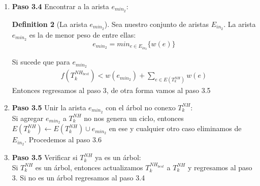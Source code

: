 \documentclass[letter,10pt]{article}
\theoremstyle{definition}
\newtheorem{definition}{Definition}[section]
\begin{document}
\begin{enumerate}{}
\begin{enumerate}
        Eliminamos $v_{in}$ de $T^{NH}_{k+1}$ de forma que obtenemos un bosque $(S_1,\dots,S_r)$. Aunque obtenemos un bosque, vamos a tomar este bosque como nuesto candidato al árbol $T^{NH}_k$ para el cual nos preocuparemos por construir en lo que resta del paso 3, si es que merece la pena.
        Procedemos ahora a encontrar el conjunto de aristas $E_{in_2}$:

        \begin{definition}[Las aristas $E_{in_2}$] Sea el bosque $(S_1, \dots , S_r)$ obtenido de $T^{NH}_{k+1}$ al eliminar $v_{in}$. Definimos a $E_{in_2}$ como:

        \[ E_{in_2} = \{(v_i,v_j) | v_i \in S_k, v_j\in S_l, k\neq l\}\]
        
        \end{definition}
        Pasamos al paso 3.4
        \item[] \textbf{Paso 3.4} Encontrar a la arista $e_{min_2}$:\\
        \begin{definition}[La arista $e_{min_2}$] Sea nuestro conjunto de aristas $E_{in_2}$. La arista $e_{min_2}$ es la de menor peso de entre ellas:
            \[e_{min_2} =  min_{e\in E_{in_2}} \{w(e)\}\]
        
        \end{definition}
        Si sucede que para $e_{min_2}$
        \begin{align}
            f(T^{NH_{best}}_k) < w(e_{min_2})+\sum_{e\in E(T^{NH}_{k} )}w(e)
        \end{align}
        Entonces regresamos al paso 3, de otra forma vamos al paso 3.5

        \item[] \textbf{Paso 3.5} Unir la arista $e_{min_2}$ con el árbol no conexo $T^{NH}_k$:\\
        Si agregar $e_{min_2}$ a $T^{NH}_k$ no nos genera un ciclo, entonces $E(T^{NH}_k) \gets E(T^{NH}_k) \cup e_{min_2}$ en ese y cualquier otro caso eliminamos de $E_{in_2}$. Procedemos al paso 3.6
        
        \item[] \textbf{Paso 3.5} Verificar si $T^{NH}_k$ ya es un árbol:\\
        Si $T^{NH}_k$ es un árbol, entonces actualizamos $T^{NH_{best}}_k$ a $T^{NH}_k$ y regresamos al paso 3. Si no es un árbol regresamos al paso 3.4
    \end{enumerate}
    
\end{enumerate}
\end{document}
